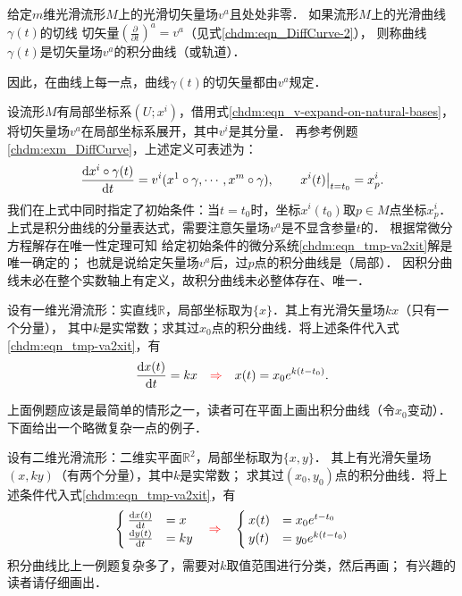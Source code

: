 \begin{definition}
    给定$m$维光滑流形$M$上的光滑切矢量场$v^a$且处处非零．
    如果流形$M$上的光滑曲线$\gamma(t)$的切线
    切矢量$(\frac{\partial}{\partial t})^a = v^a$（见式\eqref{chdm:eqn_DiffCurve-2}），
    则称曲线$\gamma(t)$是切矢量场$v^a$的{\heiti 积分曲线}（或{\heiti 轨道}）．
\end{definition}
因此，在曲线上每一点，曲线$\gamma(t)$的切矢量都由$v^a$规定．

设流形$M$有局部坐标系$(U;x^i)$，借用式\eqref{chdm:eqn_v-expand-on-natural-bases}，
将切矢量场$v^a$在局部坐标系展开，其中$v^i$是其分量．
再参考例题\ref{chdm:exm_DiffCurve}，上述定义可表述为：
\begin{equation}\label{chdm:eqn_tmp-va2xit}
    \frac{{\rm d} x^i\circ\gamma(t)}{{\rm d} t}=v^i(x^1\circ\gamma,\cdots,x^m\circ\gamma), 
    \qquad \left. x^i(t) \right|_{t=t_0} = x^i_p  . 
\end{equation}
我们在上式中同时指定了初始条件：当$t=t_0$时，坐标$x^i(t_0)$取$p\in M$点坐标$x^i_p$．
上式是积分曲线的分量表达式，需要注意矢量场$v^a$是不显含参量$t$的．
根据常微分方程解存在唯一性定理\cite[\S 31]{arnold-2001-ode}可知
给定初始条件的微分系统\eqref{chdm:eqn_tmp-va2xit}解是唯一确定的；
也就是说给定矢量场$v^a$后，过$p$点的积分曲线是（局部）．
因积分曲线未必在整个实数轴上有定义，故积分曲线未必整体存在、唯一．

\begin{example}
    设有一维光滑流形：实直线$\mathbb{R}$，局部坐标取为$\{x\}$．其上有光滑矢量场$k x$（只有一个分量），
    其中$k$是实常数；求其过$x_0$点的积分曲线．将上述条件代入式\eqref{chdm:eqn_tmp-va2xit}，有
    \begin{equation}
        \frac{{\rm d} x(t)}{{\rm d} t}= k x 
        \quad {\color{red}\Rightarrow} \quad
        x(t)= x_0 e^{k(t-t_0)}.
    \end{equation}
\end{example}
上面例题应该是最简单的情形之一，读者可在平面上画出积分曲线（令$x_0$变动）．
下面给出一个略微复杂一点的例子．
\begin{example}
    设有二维光滑流形：二维实平面$\mathbb{R}^2$，局部坐标取为$\{x,y\}$．
    其上有光滑矢量场$(x,ky)$（有两个分量），其中$k$是实常数；
    求其过$(x_0,y_0)$点的积分曲线．将上述条件代入式\eqref{chdm:eqn_tmp-va2xit}，有
    \begin{equation}
        \begin{cases}
            \frac{{\rm d} x(t)}{{\rm d} t}& =  x \\
            \frac{{\rm d} y(t)}{{\rm d} t}&= k y
        \end{cases}
        \quad {\color{red}\Rightarrow} \quad
        \begin{cases}
            x(t)& =  x_0 e^{t-t_0} \\
            y(t)& =  y_0 e^{k(t-t_0)} 
        \end{cases}
    \end{equation}
积分曲线比上一例题复杂多了，需要对$k$取值范围进行分类，然后再画；
有兴趣的读者请仔细画出．
\end{example}

